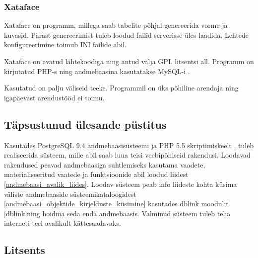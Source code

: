 \documentclass[a4paper,12pt]{article} %
\begin{document}
\subsubsection{Xataface}
Xataface on programm, millega saab tabelite põhjal genereerida vorme ja kuvasid. Pärast genereerimist tuleb loodud failid serverisse üles laadida. Lehtede konfigureerimine toimub INI failide abil.\cite{Xataface}\par
Xataface on avatud lähtekoodiga ning antud välja GPL litsentsi all. Programm on kirjutatud PHP-s \cite{PHP} ning andmebaasina kasutatakse MySQL-i \cite{MySQL}.\par
Kasutatud on palju väliseid teeke. Programmil on üks põhiline arendaja ning igapäevast arendustööd ei toimu. \cite{XatafaceGitHub}
\subsection{Täpsustunud ülesande püstitus}
Kasutades PostgreSQL 9.4 andmebaasisüsteemi \cite{PostgreSQL} ja PHP 5.5 skriptimiskeelt \cite{PHP}, tuleb realiseerida süsteem, mille abil saab luua teisi veebipõhiseid rakendusi. Loodavad rakendused peavad andmebaasiga suhtlemiseks kasutama vaadete, materialiseeritud vaatede ja funktsioonide abil loodud liidest \ref{andmebaasi_avalik_liides}. Loodav süsteem peab info liideste kohta küsima väliste andmebaaside süsteemikataloogidest \ref{andmebaasi_objektide_kirjelduste_küsimine} kasutades dblink moodulit \ref{dblink}ning hoidma seda enda andmebaasis. Valminud süsteem tuleb teha interneti teel avalikult kättesaadavaks.

\subsection{Litsents}
\end{document}
